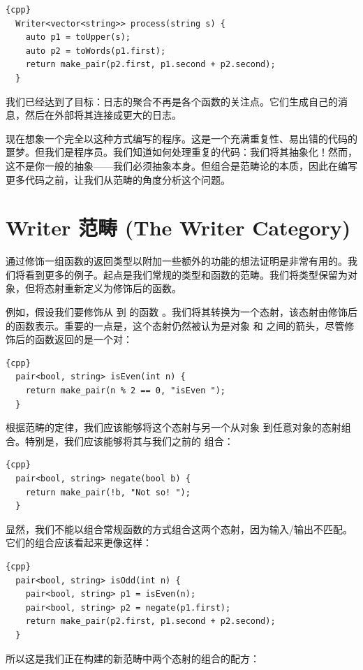 \begin{lstlisting}{cpp}
  Writer<vector<string>> process(string s) {
    auto p1 = toUpper(s);
    auto p2 = toWords(p1.first);
    return make_pair(p2.first, p1.second + p2.second);
  }
\end{lstlisting}
我们已经达到了目标：日志的聚合不再是各个函数的关注点。它们生成自己的消息，然后在外部将其连接成更大的日志。

现在想象一个完全以这种方式编写的程序。这是一个充满重复性、易出错的代码的噩梦。但我们是程序员。我们知道如何处理重复的代码：我们将其抽象化！然而，这不是你一般的抽象——我们必须抽象本身。但组合是范畴论的本质，因此在编写更多代码之前，让我们从范畴的角度分析这个问题。

\section{Writer 范畴 (The Writer Category)}

通过修饰一组函数的返回类型以附加一些额外的功能的想法证明是非常有用的。我们将看到更多的例子。起点是我们常规的类型和函数的范畴。我们将类型保留为对象，但将态射重新定义为修饰后的函数。

例如，假设我们要修饰从  到  的函数 。我们将其转换为一个态射，该态射由修饰后的函数表示。重要的一点是，这个态射仍然被认为是对象  和  之间的箭头，尽管修饰后的函数返回的是一个对：

\begin{lstlisting}{cpp}
  pair<bool, string> isEven(int n) {
    return make_pair(n % 2 == 0, "isEven ");
  }
\end{lstlisting}
根据范畴的定律，我们应该能够将这个态射与另一个从对象  到任意对象的态射组合。特别是，我们应该能够将其与我们之前的  组合：

\begin{lstlisting}{cpp}
  pair<bool, string> negate(bool b) {
    return make_pair(!b, "Not so! ");
  }
\end{lstlisting}
显然，我们不能以组合常规函数的方式组合这两个态射，因为输入/输出不匹配。它们的组合应该看起来更像这样：

\begin{lstlisting}{cpp}
  pair<bool, string> isOdd(int n) {
    pair<bool, string> p1 = isEven(n);
    pair<bool, string> p2 = negate(p1.first);
    return make_pair(p2.first, p1.second + p2.second);
  }
\end{lstlisting}
所以这是我们正在构建的新范畴中两个态射的组合的配方：

